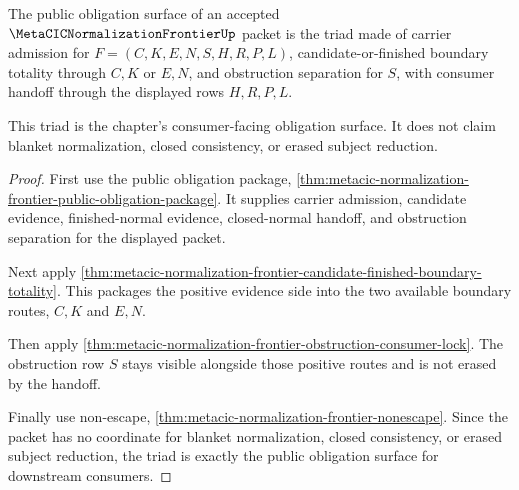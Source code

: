 \begin{theorem}
\label{thm:metacic-normalization-frontier-obligation-triad}
The public obligation surface of an accepted
$\MetaCICNormalizationFrontierUp$ packet is the triad made of carrier
admission for $F=(C,K,E,N,S,H,R,P,L)$, candidate-or-finished boundary
totality through $C,K$ or $E,N$, and obstruction separation for $S$, with
consumer handoff through the displayed rows $H,R,P,L$.

This triad is the chapter's consumer-facing obligation surface. It does not
claim blanket normalization, closed consistency, or erased subject reduction.
\end{theorem}
\begin{proof}
First use the public obligation package,
\autoref{thm:metacic-normalization-frontier-public-obligation-package}. It
supplies carrier admission, candidate evidence, finished-normal evidence,
closed-normal handoff, and obstruction separation for the displayed packet.

Next apply
\autoref{thm:metacic-normalization-frontier-candidate-finished-boundary-totality}.
This packages the positive evidence side into the two available boundary
routes, $C,K$ and $E,N$.

Then apply
\autoref{thm:metacic-normalization-frontier-obstruction-consumer-lock}. The
obstruction row $S$ stays visible alongside those positive routes and is not
erased by the handoff.

Finally use non-escape,
\autoref{thm:metacic-normalization-frontier-nonescape}. Since the packet has
no coordinate for blanket normalization, closed consistency, or erased
subject reduction, the triad is exactly the public obligation surface for
downstream consumers.
\end{proof}

